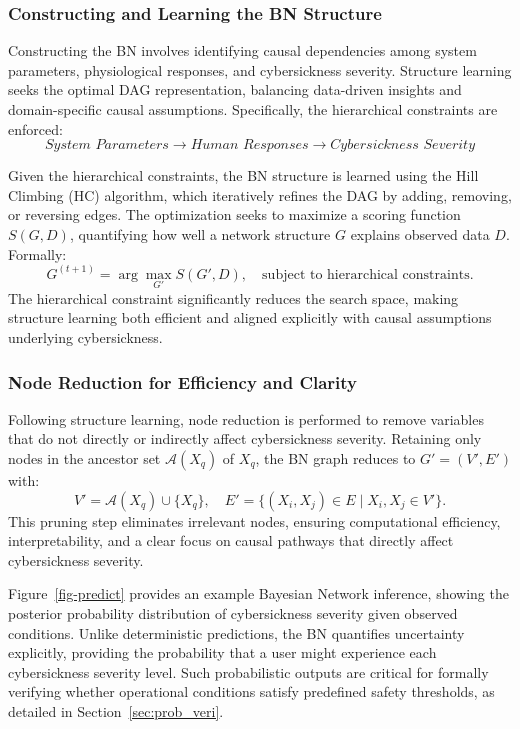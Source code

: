 \documentclass{vgtc}                          %
\begin{document}
\subsubsection{Constructing and Learning the BN Structure}
Constructing the BN involves identifying causal dependencies among system parameters, physiological responses, and cybersickness severity. Structure learning seeks the optimal DAG representation, balancing data-driven insights and domain-specific causal assumptions. Specifically, the hierarchical constraints are enforced:
\[
\textit{System Parameters} \rightarrow \textit{Human Responses} \rightarrow \textit{Cybersickness Severity}
\]

Given the hierarchical constraints, the BN structure is learned using the Hill Climbing (HC) algorithm\cite{tsamardinos2006max}, which iteratively refines the DAG by adding, removing, or reversing edges. The optimization seeks to maximize a scoring function \(S(G,D)\), quantifying how well a network structure \(G\) explains observed data \(D\). Formally:
\[
G^{(t+1)} = \arg\max_{G'} S(G',D), \quad \text{subject to hierarchical constraints.}
\]
The hierarchical constraint significantly reduces the search space, making structure learning both efficient and aligned explicitly with causal assumptions underlying cybersickness.

\subsubsection{Node Reduction for Efficiency and Clarity}
Following structure learning, node reduction is performed to remove variables that do not directly or indirectly affect cybersickness severity. Retaining only nodes in the ancestor set \(\mathcal{A}(X_q)\) of \(X_q\), the BN graph reduces to \(G'=(V',E')\) with:
\[
V' = \mathcal{A}(X_q) \cup \{X_q\}, \quad
E' = \{(X_i,X_j) \in E \mid X_i,X_j \in V'\}.
\]
This pruning step eliminates irrelevant nodes, ensuring computational efficiency, interpretability, and a clear focus on causal pathways that directly affect cybersickness severity.

Figure~\ref{fig-predict} provides an example Bayesian Network inference, showing the posterior probability distribution of cybersickness severity given observed conditions. Unlike deterministic predictions, the BN quantifies uncertainty explicitly, providing the probability that a user might experience each cybersickness severity level. Such probabilistic outputs are critical for formally verifying whether operational conditions satisfy predefined safety thresholds, as detailed in Section~\ref{sec:prob_veri}.
\end{document}
